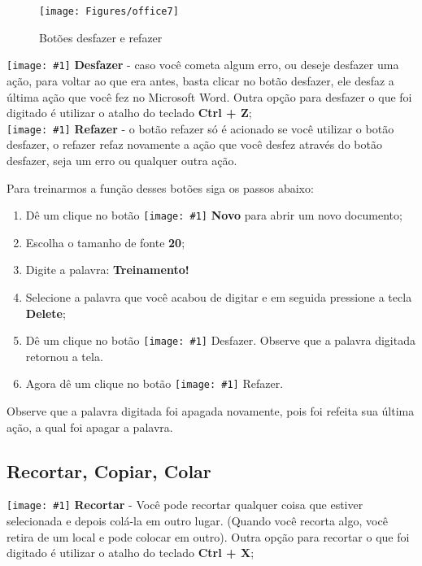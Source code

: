 \documentclass[hidelinks,12pt]{article}
\newcommand{\icon}[1]{\texttt{[image: \#1]}}
\begin{document}
\begin{figure}[!h]
	\centering
	\texttt{[image: Figures/office7]}
	\label{fig:office7}
	\caption{Botões desfazer e refazer}
\end{figure}

\icon{Figures/desfazer} \textbf{Desfazer} - caso você cometa algum erro, ou deseje desfazer uma ação, para voltar ao que era antes, basta clicar no botão desfazer, ele desfaz a última ação que você fez no Microsoft Word. Outra opção para desfazer o que foi digitado é utilizar o atalho do teclado \textbf{Ctrl + Z};\\

\icon{Figures/refazer} \textbf{Refazer} - o botão refazer só é acionado se você utilizar o botão desfazer, o refazer refaz novamente a ação que você desfez através do botão desfazer, seja um erro ou qualquer outra ação.

Para treinarmos a função desses botões siga os passos abaixo:

\begin{enumerate}
	\item Dê um clique no botão \icon{Figures/novo} \textbf{Novo} para abrir um novo documento;

	\item Escolha o tamanho de fonte \textbf{20};

	\item  Digite a palavra: \textbf{Treinamento!}


	\item Selecione a palavra que você acabou de digitar e em seguida pressione a tecla \textbf{Delete};

	\item Dê um clique no botão \icon{Figures/desfazer} Desfazer. Observe que a palavra digitada retornou  a tela.

	\item Agora dê um clique no botão \icon{Figures/refazer} Refazer.
\end{enumerate}

Observe que a palavra digitada foi apagada novamente, pois foi refeita sua última ação, a qual foi apagar a palavra.


\subsection{Recortar, Copiar, Colar}

\icon{Figures/recortar} \textbf{Recortar} - Você pode recortar qualquer coisa que estiver selecionada e depois colá-la em outro lugar. (Quando você recorta algo, você retira de um local e pode colocar em outro). Outra opção para recortar o que foi digitado é utilizar o atalho do teclado \textbf{Ctrl + X};
\end{document}
